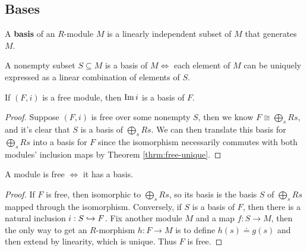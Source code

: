 \documentclass[twoside,10pt]{report}
\begin{document}
\subsection{Bases}

\begin{defn}[]
A \textbf{basis} of an $R$-module $M$ is a linearly independent subset of $M$ that generates $M$.
\end{defn}

\begin{thrm}[]
A nonempty subset $S \subseteq M$ is a basis of $M \iff$ each element of $M$ can be uniquely expressed as a linear combination of elements of $S$.
\end{thrm}

\begin{prop}
	If $(F,i)$ is a free module, then $\operatorname{Im} i$ is a basis of $F$.
\end{prop}
\begin{proof}
	Suppose $(F,i)$ is free over some nonempty $S$, then we know $F \cong \bigoplus_{s}Rs$, and it's clear that $S$ is a basis of $\bigoplus_{s}Rs$. We can then translate this basis for $\bigoplus_{s}Rs$ into a basis for $F$ since the isomorphism necessarily commutes with both modules' inclusion maps by Theorem \ref{thrm:free-unique}.
\end{proof}

\begin{thrm}[]
A module is free $\iff$ it has a basis.
\end{thrm}
\begin{proof}
	If $F$ is free, then isomorphic to $\bigoplus_{s}Rs$, so its basis is the basis $S$ of $\bigoplus_{s}Rs$ mapped through the isomorphism. Conversely, if $S$ is a basis of $F$, then there is a natural inclusion $i:S \hookrightarrow F$. Fix another module $M$ and a map $f:S\to M$, then the only way to get an $R$-morphism $h:F\to M$ is to define $h(s) \doteq g(s)$ and then extend by linearity, which is unique. Thus $F$ is free.
\end{proof}

\end{document}
